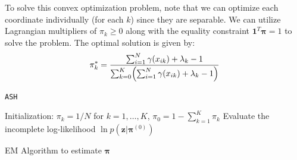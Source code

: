 \documentclass[11pt]{article}
\begin{document}
To solve this convex optimization problem, note that we can optimize each coordinate individually (for each $k$) since they are separable. We can utilize Lagrangian multipliers of $\pi_k \geqslant 0$ along with the equality constraint $\mathbf{1}^T \boldsymbol{\pi} = 1$ to solve the problem. The optimal solution is given by:
$$
\pi_k^{*} = \frac{\sum_{i=1}^N\gamma(x_{ik}) + \lambda_k - 1}{\sum_{k=0}^K \Bigl( \sum_{i=1}^N\gamma(x_{ik}) + \lambda_k - 1 \Bigl)}
$$


\begin{algorithm}[H]
\begin{lrbox}{\mycode}
\verb!ASH!
\end{lrbox}
\SetAlgoLined
{}
Initialization: $\pi_k = 1/N$ for $k = 1, \ldots, K$, $\pi_0 = 1 - \sum_{k=1}^K \pi_k$ \;
Evaluate the incomplete log-likelihood $\ln p ( \mathbf{z}  \vert \boldsymbol{\pi}^{(0)} )$ \;
\caption{EM Algorithm to estimate $\boldsymbol{\pi}$}
\end{algorithm}
\end{document}

